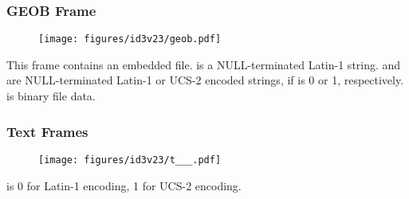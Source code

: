 \subsubsection{GEOB Frame}
\begin{figure}[h]
\texttt{[image: figures/id3v23/geob.pdf]}
\end{figure}
This frame contains an embedded file.
 is a NULL-terminated Latin-1 string.
 and  are NULL-terminated
Latin-1 or UCS-2 encoded strings, if  is 0 or 1,
respectively.
 is binary file data.

\clearpage

\subsubsection{Text Frames}
\begin{figure}[h]
\texttt{[image: figures/id3v23/t\_\_\_.pdf]}
\end{figure}
 is 0 for Latin-1 encoding, 1 for UCS-2 encoding.

